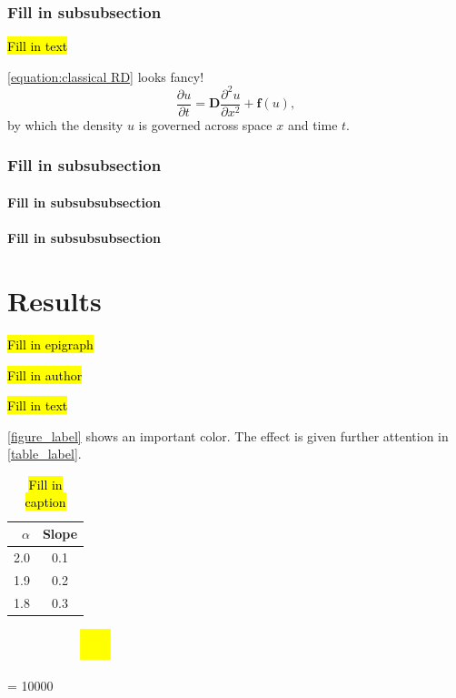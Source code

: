 \documentclass[oneside]{book}
\begin{document}
\subsection{Fill in subsubsection}

\hl{Fill in text}

\autoref{equation:classical RD} looks fancy!
\begin{equation}
\label{equation:classical RD}
\dfrac{\partial u}{\partial t} = \mathbf{D}\dfrac{\partial ^2 u}{\partial x^2} + \mathbf{f}(u),
\end{equation}
by which the density $u$ is governed across space $x$ and time $t$.

\subsection{Fill in subsubsection}
\subsubsection{Fill in subsubsubsection}
\subsubsection{Fill in subsubsubsection}

\chaptercloser

\chapter{Results}
\label{chap:results}

\label{chap:introduction}
\epigraph{\hl{Fill in epigraph}}{\hl{Fill in author}}

\hl{Fill in text}

\autoref{figure_label} shows an important color.
The effect is given further attention in \autoref{table_label}.

\begin{table}
\centering
\caption{\hl{Fill in caption}}
\bgroup
\def\arraystretch{1.5}
\begin{tabular}{r|c}
$\alpha$	& Slope	\\
\hline
2.0 & 0.1 \\
1.9 & 0.2 \\
1.8 & 0.3 \\
\end{tabular}
\egroup
\label{table_label}
\end{table}

\begin{figure}
\centering
\caption{
\hl{Fill in caption}
}
\begin{subfigure}{1.0\textwidth}
\centering
\includegraphics[clip, trim = 0.5cm 0.5cm 0.5cm 0.5cm, width = 0.1\textwidth]{image.png}
\end{subfigure}
\label{figure_label}
\end{figure}

\clearpage
\interlinepenalty = 10000 %



\clearpage
{}

\end{document}
